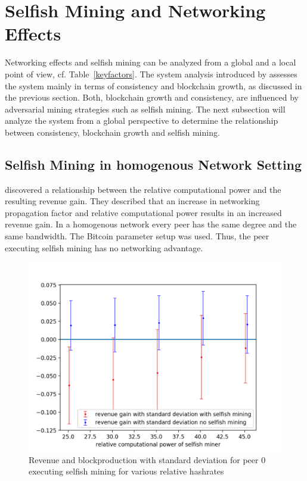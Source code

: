\section{Selfish Mining and Networking Effects}
Networking effects and selfish mining can be analyzed from a global and a local point of view, cf. Table~\ref{keyfactors}. The system analysis introduced by \gopalan assesses the system mainly in terms of consistency and blockchain growth, as discussed in the previous section. Both, blockchain growth and consistency, are influenced by adversarial mining strategies such as selfish mining. The next subsection will analyze the system from a global perspective to determine the relationship between consistency, blockchain growth and selfish mining. 


\subsection{Selfish Mining in homogenous Network Setting}
 discovered a relationship between the relative computational power and the resulting revenue gain. They described that an increase in networking propagation factor and relative computational power results in an increased revenue gain. In a homogenous network every peer has the same degree and the same bandwidth. The Bitcoin parameter setup was used. Thus, the peer executing selfish mining has no networking advantage. 
\begin{figure}[h]
	\includegraphics[width=\textwidth]{figures/multi_hr_rev_and_bpr_per_peer.png}
	\caption{Revenue and blockproduction with standard deviation for peer $0$ executing selfish mining for various relative hashrates}
	\label{fig:multi_hr}
\end{figure}
